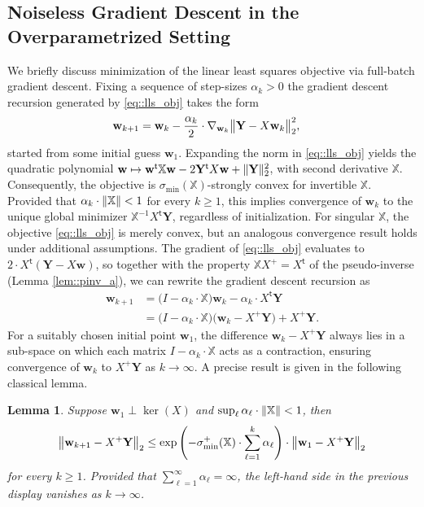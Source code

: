 \documentclass{article}
\newcommand*{\bbX}{\mathbb{X}}
\newcommand*{\bfY}{\mathbf{Y}}
\newcommand*{\bfw}{\mathbf{w}}
\newcommand*{\inv}{^{-1}}
\newcommand*{\pinv}{^{+}}
\newcommand*{\tran}{^{\mathsf{t}}}
\newcommand*{\sigmin}{\sigma_{\mathrm{min}}}
\newcommand*{\sigminp}{\sigma_{\mathrm{min}}^+}
\DeclarePairedDelimiter{\norm}{\lVert}{\rVert}
\newcommand{\weight}{\bfw}
\newtheorem{lemma}{Lemma}[section]
\begin{document}
\subsection{Noiseless Gradient Descent in the Overparametrized Setting}

We briefly discuss minimization of the linear least squares objective via
full-batch gradient descent. Fixing a sequence of step-sizes $\alpha_k > 0$ the
gradient descent recursion generated by \eqref{eq::lls_obj} takes the form
\begin{align*}
  \weight_{k + 1} &= \weight_k - \dfrac{\alpha_k}{2} \cdot
  \nabla_{\weight_k}\norm[\big]{\bfY - X \weight_k}_2^2,
\end{align*} started from some initial guess $\weight_1$. Expanding the norm in
\eqref{eq::lls_obj} yields the quadratic polynomial $\weight \mapsto
\weight\tran \bbX \weight - 2 \bfY\tran X \weight + \norm{\bfY}_2^2$, with
second derivative $\bbX$. Consequently, the objective is
$\sigmin(\bbX)$-strongly convex for invertible $\bbX$. Provided that $\alpha_k
\cdot \norm{\bbX} < 1$ for every $k \geq 1$, this implies convergence of
$\weight_k$ to the unique global minimizer $\bbX\inv X\tran \bfY$, regardless of
initialization. For singular $\bbX$, the objective \eqref{eq::lls_obj} is merely
convex, but an analogous convergence result holds under additional assumptions.
The gradient of \eqref{eq::lls_obj} evaluates to $2 \cdot X\tran (\bfY - X
\weight)$, so together with the property $\bbX X\pinv = X\tran$ of the
pseudo-inverse (Lemma \ref{lem::pinv_a}), we can rewrite the gradient descent
recursion as \begin{equation}
  \label{eq::rec_gd_nn}
  \begin{split}
    \weight_{k + 1} &= \big(I - \alpha_k \cdot \bbX\big) \weight_k - \alpha_k
    \cdot X\tran \bfY\\
    &= \big(I - \alpha_k \cdot \bbX\big) \big(\weight_k - X\pinv \bfY\big) +
    X\pinv \bfY.
  \end{split}
\end{equation} For a suitably chosen initial point $\weight_1$, the difference
$\weight_k - X\pinv \bfY$ always lies in a sub-space on which each matrix $I -
\alpha_k \cdot \bbX$ acts as a contraction, ensuring convergence of $\weight_k$
to $X\pinv \bfY$ as $k \to \infty$. A precise result is given in the following
classical lemma.

\begin{lemma}
  \label{lem::conv_gd}
  Suppose $\weight_1 \perp \ker(X)$ and $\sup_{\ell} \alpha_\ell \cdot
  \norm{\bbX} < 1$, then \begin{align*}
    \norm[\big]{\weight_{k + 1} - X\pinv \bfY}_2 \leq \exp \left(-
    \sigminp(\bbX) \cdot \sum_{\ell = 1}^k \alpha_\ell\right) \cdot
    \norm[\big]{\weight_1 - X\pinv \bfY}_2
  \end{align*} for every $k \geq 1$. Provided that $\sum_{\ell = 1}^\infty
  \alpha_\ell = \infty$, the left-hand side in the previous display vanishes as
  $k \to \infty$.
\end{lemma}
\end{document}
